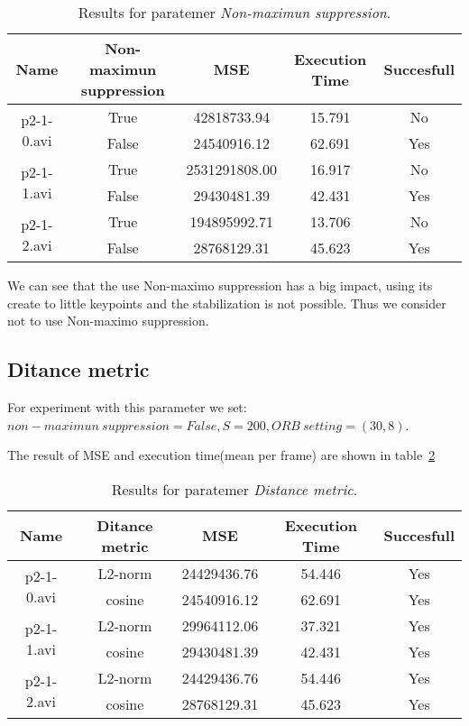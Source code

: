 \begin{table}[H]
\centering
\begin{tabular}{|c|c|c|c|c|}
\hline
\textbf{Name} & \textbf{Non-maximun suppression} & \textbf{MSE} & \textbf{Execution Time} & \textbf{Succesfull} \\ \hline
\multirow{2}{*}{p2-1-0.avi} & True & 42818733.94 & 15.791 & No \\ \cline{2-5} 
 & False & 24540916.12 & 62.691 & Yes \\ \hline
\multirow{2}{*}{p2-1-1.avi} & True & 2531291808.00 & 16.917 & No \\ \cline{2-5} 
 & False & 29430481.39 & 42.431 & Yes \\ \hline
\multirow{2}{*}{p2-1-2.avi} & True & 194895992.71 & 13.706 & No \\ \cline{2-5} 
 & False & 28768129.31 & 45.623 & Yes \\ \hline
\end{tabular}
\caption{Results for paratemer \textit{Non-maximun suppression}.}
\label{table:comparison-NMS}
\end{table}

We can see that the use Non-maximo suppression has a big impact, using its create to little keypoints and the stabilization is not possible. Thus we consider not to use Non-maximo suppression.

\subsection{Ditance metric}

For experiment with this parameter we set: $non-maximun~suppression=False, S=200, ORB~ setting = (30,8)$.

The result of MSE and execution time(mean per frame) are shown in table~\ref{table:comparison-DM}

\begin{table}[H]
\centering
\begin{tabular}{|c|c|c|c|c|}
\hline
\textbf{Name} & \textbf{Ditance metric} & \textbf{MSE} & \textbf{Execution Time} & \textbf{Succesfull} \\ \hline
\multirow{2}{*}{p2-1-0.avi} & L2-norm & 24429436.76 & 54.446 & Yes \\ \cline{2-5} 
 & cosine & 24540916.12 & 62.691 & Yes \\ \hline
\multirow{2}{*}{p2-1-1.avi} & L2-norm & 29964112.06 & 37.321 & Yes \\ \cline{2-5} 
 & cosine & 29430481.39 & 42.431 & Yes \\ \hline
\multirow{2}{*}{p2-1-2.avi} & L2-norm & 24429436.76 & 54.446 & Yes \\ \cline{2-5} 
 & cosine & 28768129.31 & 45.623 & Yes \\ \hline
\end{tabular}
\caption{Results for paratemer \textit{Distance metric}.}
\label{table:comparison-DM}
\end{table}

